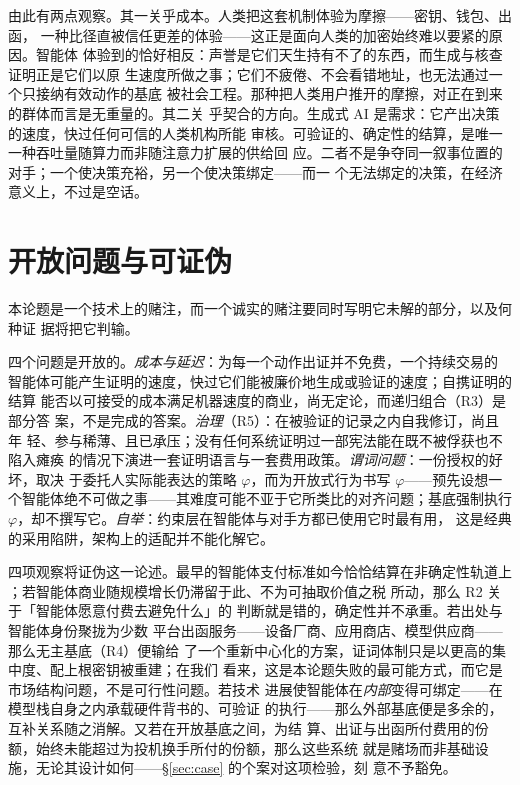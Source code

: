 \documentclass[11pt,UTF8]{ctexart}
\newcommand{\R}[1]{R#1}
\begin{document}
由此有两点观察。其一关乎成本。人类把这套机制体验为摩擦——密钥、钱包、出函，
一种比径直被信任更差的体验——这正是面向人类的加密始终难以要紧的原因。智能体
体验到的恰好相反：声誉是它们天生持有不了的东西，而生成与核查证明正是它们以原
生速度所做之事；它们不疲倦、不会看错地址，也无法通过一个只接纳有效动作的基底
被社会工程。那种把人类用户推开的摩擦，对正在到来的群体而言是无重量的。其二关
乎契合的方向。生成式 AI 是需求：它产出决策的速度，快过任何可信的人类机构所能
审核。可验证的、确定性的结算，是唯一一种吞吐量随算力而非随注意力扩展的供给回
应。二者不是争夺同一叙事位置的对手；一个使决策充裕，另一个使决策绑定——而一
个无法绑定的决策，在经济意义上，不过是空话。

\section{开放问题与可证伪}
\label{sec:open}

本论题是一个技术上的赌注，而一个诚实的赌注要同时写明它未解的部分，以及何种证
据将把它判输。

四个问题是开放的。\emph{成本与延迟}：为每一个动作出证并不免费，一个持续交易的
智能体可能产生证明的速度，快过它们能被廉价地生成或验证的速度；自携证明的结算
能否以可接受的成本满足机器速度的商业，尚无定论，而递归组合（\R{3}）是部分答
案，不是完成的答案。\emph{治理}（\R{5}）：在被验证的记录之内自我修订，尚且年
轻、参与稀薄、且已承压；没有任何系统证明过一部宪法能在既不被俘获也不陷入瘫痪
的情况下演进一套证明语言与一套费用政策。\emph{谓词问题}：一份授权的好坏，取决
于委托人实际能表达的策略 $\varphi$，而为开放式行为书写 $\varphi$——预先设想一
个智能体绝不可做之事——其难度可能不亚于它所类比的对齐问题；基底强制执行
$\varphi$，却不撰写它。\emph{自举}：约束层在智能体与对手方都已使用它时最有用，
这是经典的采用陷阱，架构上的适配并不能化解它。

四项观察将证伪这一论述。最早的智能体支付标准如今恰恰结算在非确定性轨道上
\citep{x402coinbase2025}；若智能体商业随规模增长仍滞留于此、不为可抽取价值之税
\citep{daian2020flashboys} 所动，那么 \R{2} 关于「智能体愿意付费去避免什么」的
判断就是错的，确定性并不承重。若出处与智能体身份聚拢为少数
平台出函服务——设备厂商、应用商店、模型供应商——那么无主基底（\R{4}）便输给
了一个重新中心化的方案，证词体制只是以更高的集中度、配上根密钥被重建；在我们
看来，这是本论题失败的最可能方式，而它是市场结构问题，不是可行性问题。若技术
进展使智能体在\emph{内部}变得可绑定——在模型栈自身之内承载硬件背书的、可验证
的执行——那么外部基底便是多余的，互补关系随之消解。又若在开放基底之间，为结
算、出证与出函所付费用的份额，始终未能超过为投机换手所付的份额，那么这些系统
就是赌场而非基础设施，无论其设计如何——\S\ref{sec:case} 的个案对这项检验，刻
意不予豁免。
\end{document}
